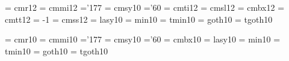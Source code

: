  \font\twlrm  = cmr12                 %
 \font\twlmi  = cmmi12               %
    \skewchar\twlmi ='177          %
 \font\twlsy  = cmsy10    %
    \skewchar\twlsy ='60           %
 \font\twlit  = cmti12               %
 \font\twlsl  = cmsl12               %
 \font\twlbf  = cmbx12               %
 \font\twltt  = cmtt12               %
    \hyphenchar\twltt = -1         %
 \font\twlsf  = cmss12               %
 \font\twlly  = lasy10   %
\font\twlmin  = min10     %
\font\twltmin = tmin10    %
\font\twlgt   = goth10    %
\font\twltgt  = tgoth10   %
  

 \font\frtnrm  = cmr10     %
 \font\frtnmi  = cmmi10    %
    \skewchar\frtnmi ='177          %
 \font\frtnsy  = cmsy10    %
    \skewchar\frtnsy ='60           %
 \font\frtnbf  = cmbx10    %
 \font\frtnly  = lasy10   %
\font\frtnmin  = min10    %
\font\frtntmin = tmin10   %
\font\frtngt   = goth10   %
\font\frtntgt  = tgoth10  %
  

